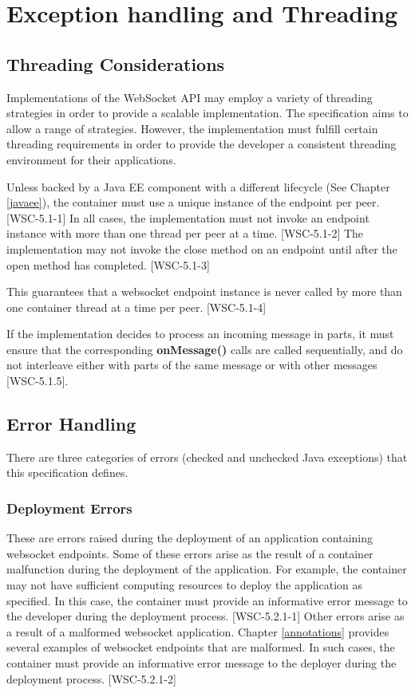 \chapter{Exception handling and Threading}

\section{Threading Considerations}

Implementations of the WebSocket API may employ a variety of threading strategies in order to provide a scalable implementation. The specification aims to allow a range of strategies. However, the implementation must fulfill certain threading requirements in order to provide the developer a consistent threading environment for their applications.

Unless backed by a Java EE component with a different lifecycle (See Chapter \ref{javaee}), the container must use a unique instance of the endpoint per peer.  [WSC-5.1-1] In all cases, the implementation must not invoke an endpoint instance with more than one thread per peer at a time. [WSC-5.1-2] The implementation may not invoke the close method on an endpoint until after the open method has completed. [WSC-5.1-3]

This guarantees that a websocket endpoint instance is never called by more than one container thread at a time per peer.  [WSC-5.1-4]

If the implementation decides to process an incoming message in parts, it must ensure that the corresponding \textbf{onMessage()} calls are called sequentially, and do not interleave either with parts of the same message or with other messages [WSC-5.1.5]. 


\section{Error Handling}
\label{exception:error}

There are three categories of errors (checked and unchecked Java exceptions) that this specification defines.

\subsection{Deployment Errors}

These are errors raised during the deployment of an application containing websocket endpoints. Some of these errors arise as the result of a container malfunction during the deployment of the application. For example, the container may not have sufficient computing resources to deploy the application as specified. In this case, the container must provide an informative error message to the developer during the deployment process.  [WSC-5.2.1-1] Other errors arise as a result of a malformed websocket application. Chapter \ref{annotations} provides several examples of websocket endpoints that are malformed. In such cases, the container must provide an informative error message to the deployer during the deployment process. [WSC-5.2.1-2]

